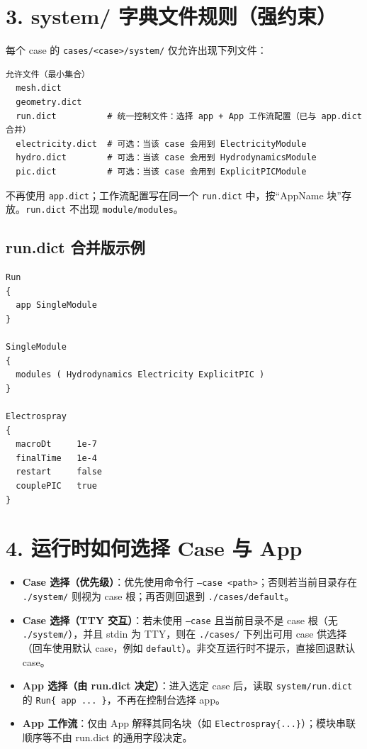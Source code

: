 \documentclass[UTF8,a4paper,11pt]{ctexart}
\begin{document}
\section*{3. system/ 字典文件规则（强约束）}
每个 case 的 \texttt{cases/<case>/system/} 仅允许出现下列文件：
\begin{lstlisting}
允许文件（最小集合）
  mesh.dict
  geometry.dict
  run.dict          # 统一控制文件：选择 app + App 工作流配置（已与 app.dict 合并）
  electricity.dict  # 可选：当该 case 会用到 ElectricityModule
  hydro.dict        # 可选：当该 case 会用到 HydrodynamicsModule
  pic.dict          # 可选：当该 case 会用到 ExplicitPICModule
\end{lstlisting}

不再使用 \texttt{app.dict}；工作流配置写在同一个 \texttt{run.dict} 中，按“AppName 块”存放。\texttt{run.dict} 不出现 \texttt{module/modules}。

\subsection*{run.dict 合并版示例}
\begin{lstlisting}
Run
{
  app SingleModule
}

SingleModule
{
  modules ( Hydrodynamics Electricity ExplicitPIC )
}

Electrospray
{
  macroDt     1e-7
  finalTime   1e-4
  restart     false
  couplePIC   true
}
\end{lstlisting}

\section*{4. 运行时如何选择 Case 与 App}
\begin{itemize}
\item \textbf{Case 选择（优先级）}：优先使用命令行 \texttt{--case <path>}；否则若当前目录存在 \texttt{./system/} 则视为 case 根；再否则回退到 \texttt{./cases/default}。
\item \textbf{Case 选择（TTY 交互）}：若未使用 \texttt{--case} 且当前目录不是 case 根（无 \texttt{./system/}），并且 stdin 为 TTY，则在 \texttt{./cases/} 下列出可用 case 供选择（回车使用默认 case，例如 \texttt{default}）。非交互运行时不提示，直接回退默认 case。
\item \textbf{App 选择（由 run.dict 决定）}：进入选定 case 后，读取 \texttt{system/run.dict} 的 \texttt{Run\{ app ... \}}，不再在控制台选择 app。\n\item \textbf{App 工作流}：仅由 App 解释其同名块（如 \texttt{Electrospray\{...\}}）；模块串联顺序等不由 run.dict 的通用字段决定。
\end{itemize}
\end{document}
